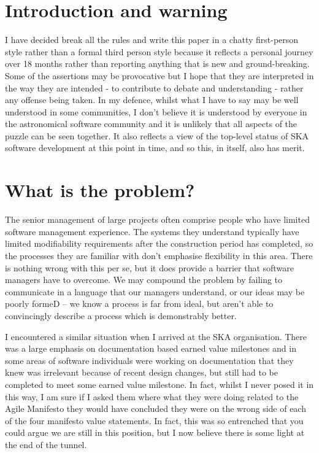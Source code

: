 \documentclass[11pt,twoside]{article}
\begin{document}
\section{Introduction and warning}
I have decided break all the rules and write this paper in a chatty first-person style rather than a formal third person style because it reflects a personal journey over 18 months rather than reporting anything that is new and ground-breaking. Some of the assertions may be provocative but I hope that they are interpreted in the way they are intended - to contribute to debate and understanding - rather any offense being taken. In my defence, whilst what I have to say may be well understood in some communities, I don't believe it is understood by everyone in the astronomical software community and it is unlikely that all aspects of the puzzle can be seen together. It also reflects a view of the top-level status of SKA software development at this point in time, and so this, in itself, also has merit.

\section{What is the problem?}
The senior management of large projects often comprise people who have limited software management experience. The systems they understand typically have limited modifiability requirements after the construction period has completed, so the processes they are familiar with don't emphasise flexibility in this area. There is nothing wrong with this per se, but it does provide a barrier that software managers have to overcome. We may compound the problem by failing to communicate in a language that our managers understand, or our ideas may be poorly formeD -- we know a process is far from ideal, but aren't able to convincingly describe a process which is demonstrably better.

I encountered a similar situation when I arrived at the SKA organisation. There was a large emphasis on documentation based earned value milestones and in some areas of software individuals were working on documentation that they knew was irrelevant because of recent design changes, but still had to be completed to meet some earned value milestone. In fact, whilst I never posed it in this way, I am sure if I asked them where what they were doing related to the Agile Manifesto\cite{agile} they would have concluded they were on the wrong side of each of the four manifesto value statements. In fact, this was so entrenched that you could argue we are still in this position, but I now believe there is some light at the end of the tunnel.
\end{document}

